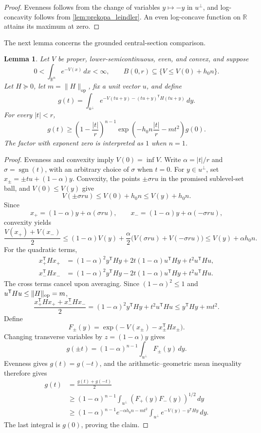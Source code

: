 \documentclass[11pt]{article}
\numberwithin{equation}{section}
\newtheorem{lemma}{Lemma}[section]
\theoremstyle{definition}
\begin{document}
\begin{proof}
Evenness follows from the change of variables $y\mapsto-y$ in
$u^\perp$, and log-concavity follows from \cref{lem:prekopa_leindler}.
An even log-concave function on $\mathbb R$ attains its maximum at zero.
\end{proof}

The next lemma concerns the grounded central-section comparison.

\begin{lemma}
\label{run01:lem:central-section}
Let $V$ be proper, lower-semicontinuous, even, and convex, and suppose
\[
0
<\int_{\mathbb R^n}e^{-V(x)}\,dx
<\infty,
\qquad
B(0,r)\subseteq\{V\leq V(0)+h_0n\}.
\]
Let $H\succeq0$, let
$m=\|H\|_{\mathrm{op}}$, fix a unit vector
$u$, and define
\[
 g(t)=\int_{u^\perp}
 e^{-V(tu+y)-(tu+y)^{\mathsf T} H(tu+y)}\,dy.
\]
For every $|t|<r$,
\begin{equation}
 g(t)\geq
 \left(1-\frac{|t|}{r}\right)^{n-1}
 \exp\!\left(-h_0n\frac{|t|}{r}-mt^2\right)g(0).
 \label{run01:eq:section-comparison}
\end{equation}
The factor with exponent zero is interpreted as $1$ when
$n=1$.
\end{lemma}

\begin{proof}
Evenness and convexity imply $V(0)=\inf V$.
Write $\alpha=|t|/r$ and
$\sigma=\operatorname{sgn}(t)$, with an arbitrary choice of
$\sigma$ when
$t=0$.
For $y\in u^\perp$, set
$x_\pm=\pm tu+(1-\alpha)y$.
Convexity, the points $\pm\sigma ru$ in the promised sublevel-set ball, and
$V(0)\leq V(y)$ give
\[
V(\pm\sigma ru)
\leq V(0)+h_0n
\leq V(y)+h_0n.
\]
Since
\[
x_+=(1-\alpha)y+\alpha(\sigma ru),
\qquad
x_-=(1-\alpha)y+\alpha(-\sigma ru),
\]
convexity yields
\[
\frac{V(x_+)+V(x_-)}2
\leq (1-\alpha)V(y) +\frac\alpha2\bigl(V(\sigma ru)+V(-\sigma ru)\bigr)
\leq V(y)+\alpha h_0n.
\]
For the quadratic terms,
\[
 \begin{aligned}
 x_+^{\mathsf T}Hx_+
 &=(1-\alpha)^2y^{\mathsf T}Hy
   +2t(1-\alpha)u^{\mathsf T}Hy+t^2u^{\mathsf T}Hu,\\
 x_-^{\mathsf T}Hx_-
 &=(1-\alpha)^2y^{\mathsf T}Hy
   -2t(1-\alpha)u^{\mathsf T}Hy+t^2u^{\mathsf T}Hu.
 \end{aligned}
\]
The cross terms cancel upon averaging.
Since $(1-\alpha)^2\leq1$ and
$u^{\mathsf T}Hu\leq\|H\|_{\rm op}=m$,
\[
\frac{x_+^{\mathsf T} Hx_++x_-^{\mathsf T} Hx_-}{2}
=(1-\alpha)^2y^{\mathsf T} Hy+t^2u^{\mathsf T} Hu
\leq y^{\mathsf T} Hy+mt^2.
\]
Define
\[
 F_\pm(y)=
 \exp\bigl(-V(x_\pm)-x_\pm^{\mathsf T}Hx_\pm\bigr).
\]
Changing transverse variables by $z=(1-\alpha)y$ gives
\[
 g(\pm t)=(1-\alpha)^{n-1}
 \int_{u^\perp}F_\pm(y)\,dy.
\]
Evenness gives $g(t)=g(-t)$, and the arithmetic--geometric mean inequality
therefore gives
\[
 \begin{aligned}
 g(t)
 &=\frac{g(t)+g(-t)}2\\
 &\geq(1-\alpha)^{n-1}
 \int_{u^\perp}(F_+(y)F_-(y))^{1/2}\,dy\\
 &\geq(1-\alpha)^{n-1}
 e^{-\alpha h_0n-mt^2}
 \int_{u^\perp}e^{-V(y)-y^{\mathsf T} Hy}\,dy.
 \end{aligned}
\]
The last integral is $g(0)$, proving the claim.
\end{proof}
\end{document}
